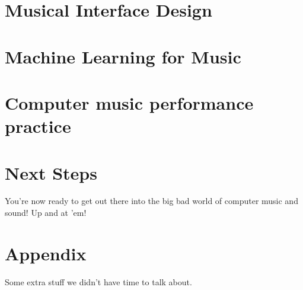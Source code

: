 \documentclass[a4paper,12pt,oldfontcommands]{memoir}
\begin{document}
\chapter{Musical Interface Design}

\chapter{Machine Learning for Music}

\chapter{Computer music performance practice}

\chapter{Next Steps}

You're now ready to get out there into the big bad world of computer
music and sound! Up and at 'em!




\appendix
\appendixpage

\chapter{Appendix}

Some extra stuff we didn't have time to talk about.
\end{document}
